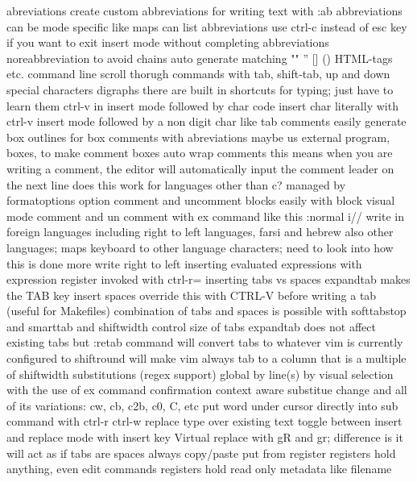 \documentclass[12pt]{book}
\begin{document}
      abreviations
        create custom abbreviations for writing text with :ab
        abbreviations can be mode specific like maps
        can list abbreviations
        use ctrl-c instead of esc key if you want to exit insert mode without completing abbreviations
        noreabbreviation to avoid chains
      auto generate matching "" '' [] {} () HTML-tags etc.
      command line
        scroll thorugh commands with tab, shift-tab, up and down
    special characters
      digraphs
        there are built in shortcuts for typing; just have to learn them
      ctrl-v in insert mode followed by char code
      insert char literally with ctrl-v insert mode followed by a non digit char like tab
    comments
      easily generate box outlines for box comments with abreviations
      maybe us external program, boxes, to make comment boxes
      auto wrap comments
        this means when you are writing a comment, the editor will automatically input the comment leader on the next line
        does this work for languages other than c?
        managed by formatoptions option
      comment and uncomment blocks easily with block visual mode
      comment and un comment with ex command like this :normal i//
    write in foreign languages including right to left languages, farsi and hebrew
      also other languages; maps keyboard to other language characters; need to look into how this is done more
      write right to left
  inserting evaluated expressions with expression register invoked with ctrl-r=
  inserting tabs vs spaces
    expandtab makes the TAB key insert spaces
    override this with CTRL-V before writing a tab (useful for Makefiles)
    combination of tabs and spaces is possible with softtabstop and smarttab and shiftwidth
    control size of tabs
    expandtab does not affect existing tabs but :retab command will convert tabs to whatever vim is currently configured to
    shiftround will make vim always tab to a column that is a multiple of shiftwidth
  substitutions (regex support)
    global
    by line(s)
    by visual selection with the use of ex command
    confirmation
    context aware substitue
    change and all of its variations: cw, cb, c2b, c0, C, etc
    put word under cursor directly into sub command with ctrl-r ctrl-w
    replace
      type over existing text
      toggle between insert and replace mode with insert key
      Virtual replace with gR and gr; difference is it will act as if tabs are spaces always
  copy/paste
    put from register
      registers hold anything, even edit commands
      registers hold read only metadata like filename
\end{document}
